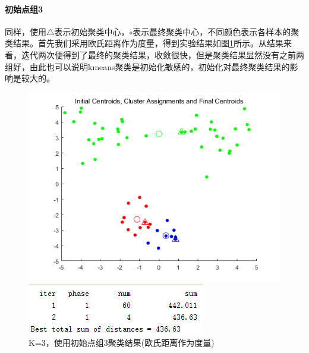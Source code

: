 \documentclass[cn]{elegantbook}
\begin{document}
\paragraph{初始点组3}
同样，使用$\triangle$表示初始聚类中心，$\circ$表示最终聚类中心，不同颜色表示各样本的聚类结果。首先我们采用欧氏距离作为度量，得到实验结果如图\ref{res33}所示。从结果来看，迭代两次便得到了最终的聚类结果，收敛很快，但是聚类结果显然没有之前两组好，由此也可以说明kmeans聚类是初始化敏感的，初始化对最终聚类结果的影响是较大的。
\begin{figure}[!h]
	\centering
	\begin{minipage}{0.48\linewidth}
		\centering
		\includegraphics[width=\linewidth]{images/res33}
	\end{minipage}
	\begin{minipage}{0.48\linewidth}
		\centering
		\includegraphics[width=\linewidth]{images/res331}
	\end{minipage}
	\caption{\label{res33}K=3，使用初始点组3聚类结果(欧氏距离作为度量)}
\end{figure}
\end{document}

